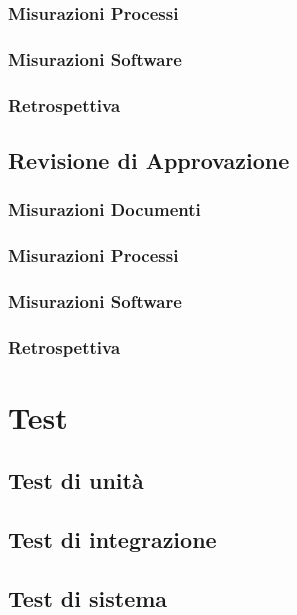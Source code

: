 \documentclass[a4paper, oneside, openany, dvipsnames, table]{article}
\begin{document}
		\subsubsection{Misurazioni Processi}
			
		\subsubsection{Misurazioni Software}
			
		\subsubsection{Retrospettiva}
			

\newpage
	\subsection{Revisione di Approvazione}
		\subsubsection{Misurazioni Documenti}
			
		\subsubsection{Misurazioni Processi}
			
		\subsubsection{Misurazioni Software}
			
		\subsubsection{Retrospettiva}
			

\newpage
\section{Test}


\subsection{Test di unità}
	
\subsection{Test di integrazione}
	
\subsection{Test di sistema}
	
	
% 		
% 		
\end{document}
